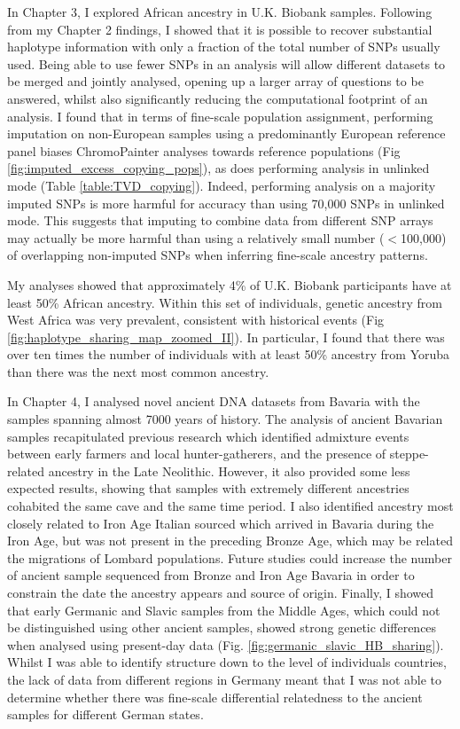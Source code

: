 In Chapter 3, I explored African ancestry in U.K. Biobank samples. Following from my Chapter 2 findings, I showed that it is possible to recover substantial haplotype information with only a fraction of the total number of SNPs usually used. Being able to use fewer SNPs in an analysis will allow different datasets to be merged and jointly analysed, opening up a larger array of questions to be answered, whilst also significantly reducing the computational footprint of an analysis. I found that in terms of fine-scale population assignment, performing imputation on non-European samples using a predominantly European reference panel biases ChromoPainter analyses towards reference populations (Fig \ref{fig:imputed_excess_copying_pops}), as does performing analysis in unlinked mode (Table \ref{table:TVD_copying}). Indeed, performing analysis on a majority imputed SNPs is more harmful for accuracy than using 70,000 SNPs in unlinked mode. This suggests that imputing to combine data from different SNP arrays may actually be more harmful than using a relatively small number ($<$100,000) of overlapping non-imputed SNPs when inferring fine-scale ancestry patterns.

My analyses showed that approximately 4\% of U.K. Biobank participants have at least 50\% African ancestry. Within this set of individuals, genetic ancestry from West Africa was very prevalent, consistent with historical events (Fig \ref{fig:haplotype_sharing_map_zoomed_II}). In particular, I found that there was over ten times the number of individuals with at least 50\% ancestry from Yoruba than there was the next most common ancestry. 

In Chapter 4, I analysed novel ancient DNA datasets from Bavaria with the samples spanning almost 7000 years of history. The analysis of ancient Bavarian samples recapitulated previous research which identified admixture events between early farmers and local hunter-gatherers, and the presence of steppe-related ancestry in the Late Neolithic. However, it also provided some less expected results, showing that samples with extremely different ancestries cohabited the same cave and the same time period. I also identified ancestry most closely related to Iron Age Italian sourced which arrived in Bavaria during the Iron Age, but was not present in the preceding Bronze Age, which may be related the migrations of Lombard populations. Future studies could increase the number of ancient sample sequenced from Bronze and Iron Age Bavaria in order to constrain the date the ancestry appears and source of origin. Finally, I showed that early Germanic and Slavic samples from the Middle Ages, which could not be distinguished using other ancient samples, showed strong genetic differences when analysed using present-day data (Fig. \ref{fig:germanic_slavic_HB_sharing}). Whilst I was able to identify structure down to the level of individuals countries, the lack of data from different regions in Germany meant that I was not able to determine whether there was fine-scale differential relatedness to the ancient samples for different German states. 

